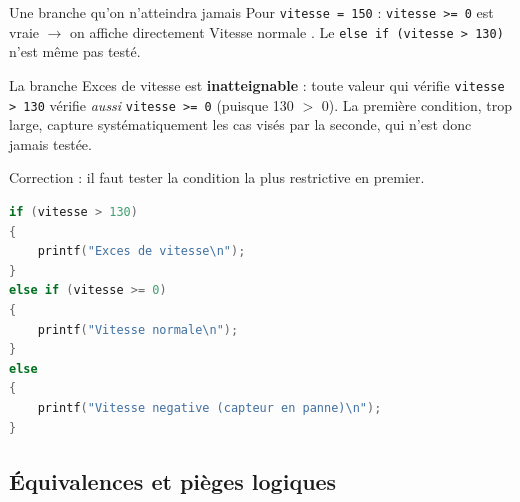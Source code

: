\begin{UPSTIprofOnlyEnv}
    \begin{UPSTIcorrectionP}{Une branche qu'on n'atteindra jamais}
        Pour \texttt{vitesse = 150} : \texttt{vitesse >= 0} est vraie $\to$ on affiche directement \og Vitesse normale \fg. Le \texttt{else if (vitesse > 130)} n'est même pas testé.

        La branche \og Exces de vitesse \fg{} est \textbf{inatteignable} : toute valeur qui vérifie \texttt{vitesse > 130} vérifie \emph{aussi} \texttt{vitesse >= 0} (puisque 130 $>$ 0). La première condition, trop large, \og capture \fg{} systématiquement les cas visés par la seconde, qui n'est donc jamais testée.

        Correction : il faut tester la condition la plus restrictive en premier.
        \begin{lstlisting}[language=C]
if (vitesse > 130)
{
    printf("Exces de vitesse\n");
}
else if (vitesse >= 0)
{
    printf("Vitesse normale\n");
}
else
{
    printf("Vitesse negative (capteur en panne)\n");
}
        \end{lstlisting}
    \end{UPSTIcorrectionP}
\end{UPSTIprofOnlyEnv}


\subsection{Équivalences et pièges logiques}

